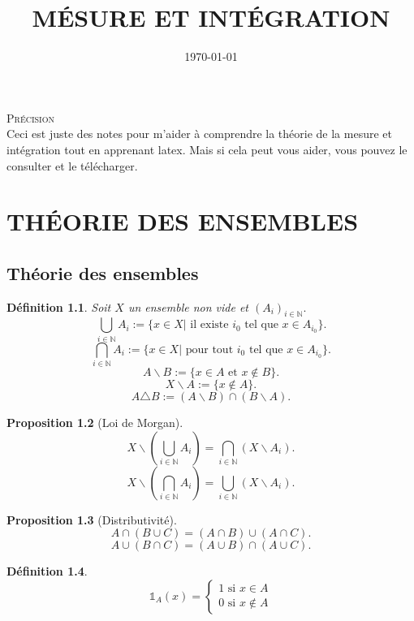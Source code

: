 \documentclass[a4paper,12pt,french]{report}
\title{MÉSURE ET INTÉGRATION}
\date{\today}
\author{}
\theoremstyle{break}
\newtheorem{defin}{Définition}[section]
\newtheorem{prop}[defin]{Proposition}
\begin{document}
\maketitle
\textsc{Précision} \\
Ceci est juste des notes pour m'aider à comprendre la théorie de la mesure et intégration tout en apprenant latex.
Mais si cela peut vous aider, vous pouvez le consulter et le télécharger.

\tableofcontents

\chapter{THÉORIE DES ENSEMBLES}

\section{Théorie des ensembles}
\begin{defin}
Soit $X$ un ensemble non vide et $(A_{i})_{i \in \mathbb{N}}.$ 
      $$\bigcup_{i \in \mathbb{N}} A_{i} := \{ x \in X | \mbox{ il existe } i_{0} \mbox{ tel que } x \in A_{i_{0}}\}.$$
      $$\bigcap_{i \in \mathbb{N}} A_{i} := \{ x \in X | \mbox{ pour tout } i_{0} \mbox{ tel que } x \in A_{i_{0}}\}.$$
      $$A \backslash B := \{ x \in A \mbox{ et } x \not\in B\}.$$
      $$X\backslash A := \{ x \not\in A\}.$$
      $$ A \triangle B := (A \backslash  B) \cap (B \backslash A).$$ 
\end{defin}

\begin{prop}[Loi de Morgan]
     $$X\backslash \left(\bigcup_{i \in \mathbb{N}} A_{i}\right) = \bigcap_{i \in \mathbb{N}} (X \backslash A_{i}).$$
     $$X\backslash \left(\bigcap_{i \in \mathbb{N}} A_{i}\right) = \bigcup_{i \in \mathbb{N}} (X \backslash A_{i}).$$
\end{prop}

\begin{prop}[Distributivité]
     $$A \cap (B \cup C) = (A \cap B) \cup (A \cap C).$$
     $$A \cup (B \cap C) = (A \cup B) \cap (A \cup C).$$
\end{prop}

\begin{defin}
       $$\mathds{1}_{A}(x) = \left\{ \begin{array}{c} 1 \mbox{ si } x \in A \\ 0 \mbox{ si } x \not\in A\end{array}\right.$$
\end{defin}
\end{document}
